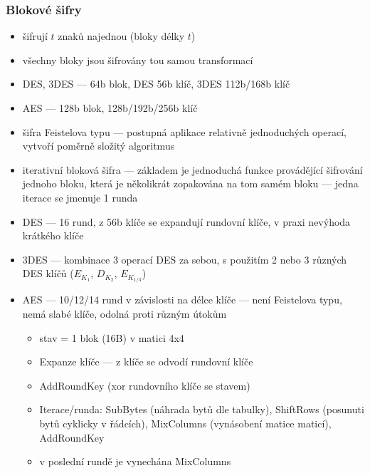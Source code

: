\subsubsection*{Blokové šifry}
\begin{itemize}
	\item šifrují $t$ znaků najednou (bloky délky $t$)
	\item všechny bloky jsou šifrovány tou samou transformací
	\item DES, 3DES --- 64b blok, DES 56b klíč, 3DES 112b/168b klíč
	\item AES --- 128b blok, 128b/192b/256b klíč
	\item šifra Feistelova typu --- postupná aplikace relativně jednoduchých operací, vytvoří poměrně složitý algoritmus
	\item iterativní bloková šifra --- základem je jednoduchá funkce provádějící šifrování jednoho bloku, která je několikrát zopakována na tom samém bloku --- jedna iterace se jmenuje 1 runda
	\item DES --- 16 rund, z 56b klíče se expandují rundovní klíče, v praxi nevýhoda krátkého klíče
	\item 3DES --- kombinace 3 operací DES za sebou, s použitím 2 nebo 3 různých DES klíčů ($E_{K_1}$, $D_{K_2}$, $E_{K_{1/3}}$)
	\item AES --- 10/12/14 rund v závislosti na délce klíče --- není Feistelova typu, nemá slabé klíče, odolná proti různým útokům
	\begin{itemize}
		\item stav = 1 blok (16B) v matici 4x4
		\item Expanze klíče --- z klíče se odvodí rundovní klíče
		\item AddRoundKey (xor rundovního klíče se stavem)
		\item Iterace/runda: SubBytes (náhrada bytů dle tabulky), ShiftRows (posunuti bytů cyklicky v řádcích), MixColumns (vynásobení matice maticí), AddRoundKey
		\item v poslední rundě je vynechána MixColumns
	\end{itemize}
	
\end{itemize}

